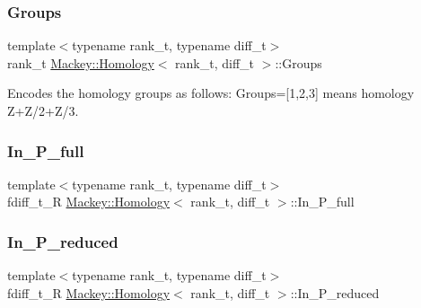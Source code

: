 \subsubsection{\texorpdfstring{Groups}{Groups}}
{\footnotesize\ttfamily template$<$typename rank\+\_\+t, typename diff\+\_\+t$>$ \\
rank\+\_\+t \hyperlink{classMackey_1_1Homology}{Mackey\+::\+Homology}$<$ rank\+\_\+t, diff\+\_\+t $>$\+::Groups}



Encodes the homology groups as follows\+: Groups=\mbox{[}1,2,3\mbox{]} means homology Z+\+Z/2+\+Z/3. 

\mbox{\label{classMackey_1_1Homology_ad2f8d8e87b9ee4f6c2db72558ab8b2a8}} 
\subsubsection{\texorpdfstring{In\+\_\+\+P\+\_\+full}{In\_P\_full}}
{\footnotesize\ttfamily template$<$typename rank\+\_\+t, typename diff\+\_\+t$>$ \\
fdiff\+\_\+t\+\_\+R \hyperlink{classMackey_1_1Homology}{Mackey\+::\+Homology}$<$ rank\+\_\+t, diff\+\_\+t $>$\+::In\+\_\+\+P\+\_\+full}

\mbox{\label{classMackey_1_1Homology_ae00a8d4ac6bdfd2de79045576200c6d2}} 
\subsubsection{\texorpdfstring{In\+\_\+\+P\+\_\+reduced}{In\_P\_reduced}}
{\footnotesize\ttfamily template$<$typename rank\+\_\+t, typename diff\+\_\+t$>$ \\
fdiff\+\_\+t\+\_\+R \hyperlink{classMackey_1_1Homology}{Mackey\+::\+Homology}$<$ rank\+\_\+t, diff\+\_\+t $>$\+::In\+\_\+\+P\+\_\+reduced}

\mbox{\label{classMackey_1_1Homology_a451ad6ea31ffe0ed18111f102ec2e370}} 
